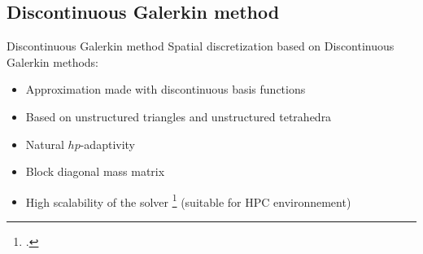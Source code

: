 \subsection{Discontinuous Galerkin method}
\begin{frame}{Discontinuous Galerkin method}
\vspace{-1.5cm}
Spatial discretization based on Discontinuous Galerkin methods:
\vspace{0.5cm}
\begin{itemize}
\item<1-> Approximation made with discontinuous basis functions
\item<2-> Based on unstructured triangles and unstructured tetrahedra
\item<3-> Natural $hp$-adaptivity
\item<4-> Block diagonal mass matrix
\item<5-> High scalability of the solver \footcite{shraggeSolving3DAcoustic2014} (suitable for HPC environnement)
\end{itemize}


\end{frame}
